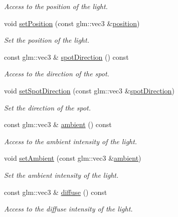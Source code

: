 \begin{DoxyCompactItemize}
\begin{DoxyCompactList}\small\item\em Access to the position of the light. \end{DoxyCompactList}\item 
void \hyperlink{classSpotLight_a7382bfe5fe8b92b0ff9dad5e25b5d48a}{set\+Position} (const glm\+::vec3 \&\hyperlink{classSpotLight_abe749d17a6042232df070529dd2d1229}{position})
\begin{DoxyCompactList}\small\item\em Set the position of the light. \end{DoxyCompactList}\item 
const glm\+::vec3 \& \hyperlink{classSpotLight_a9832f6f55fdd521b47e9c9eda8a9149b}{spot\+Direction} () const 
\begin{DoxyCompactList}\small\item\em Access to the direction of the spot. \end{DoxyCompactList}\item 
void \hyperlink{classSpotLight_adf02edfdbbb7f7f15c879e484ed4ea2f}{set\+Spot\+Direction} (const glm\+::vec3 \&\hyperlink{classSpotLight_a9832f6f55fdd521b47e9c9eda8a9149b}{spot\+Direction})
\begin{DoxyCompactList}\small\item\em Set the direction of the spot. \end{DoxyCompactList}\item 
const glm\+::vec3 \& \hyperlink{classSpotLight_a820fb8db9835283e3ed7793a8623d630}{ambient} () const 
\begin{DoxyCompactList}\small\item\em Access to the ambient intensity of the light. \end{DoxyCompactList}\item 
void \hyperlink{classSpotLight_a626e1e5331afe95e371193eca71b25f9}{set\+Ambient} (const glm\+::vec3 \&\hyperlink{classSpotLight_a820fb8db9835283e3ed7793a8623d630}{ambient})
\begin{DoxyCompactList}\small\item\em Set the ambient intensity of the light. \end{DoxyCompactList}\item 
const glm\+::vec3 \& \hyperlink{classSpotLight_a84be0450fb59905a908b6e09f16bb2e7}{diffuse} () const 
\begin{DoxyCompactList}\small\item\em Access to the diffuse intensity of the light. \end{DoxyCompactList}\item 

\end{DoxyCompactItemize}
